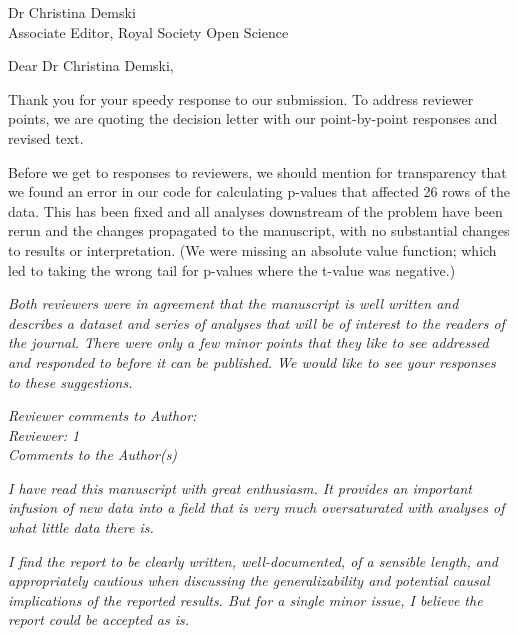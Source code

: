 \documentclass{stanfordletter}
\newcommand{\theysaid}[1]{\begin{leftbar} \noindent 
		\textsl{ #1}\end{leftbar}}
\begin{document}
	\signature{Veronica Boyce \\ Maya Mathur \\ Michael C. Frank}
	
	
	\begin{letter}{Dr Christina Demski \\ Associate Editor, Royal Society Open Science}
		
		
          \opening{Dear Dr Christina Demski,} 
          
          Thank you for your speedy response to our submission. 
          To address reviewer points, we are quoting the decision letter with our point-by-point responses and revised text. 
          
          Before we get to responses to reviewers, we should mention for transparency that we found an error in our code for calculating p-values that affected 26 rows of the data. This has been fixed and all analyses downstream of the problem have been rerun and the changes propagated to the manuscript, with no substantial changes to results or interpretation. (We were missing an absolute value function; which led to taking the wrong tail for p-values where the t-value was negative.)
          
          \theysaid{Both reviewers were in agreement that the manuscript is well written and describes a dataset and series of analyses that will be of interest to the readers of the journal. There were only a few minor points that they like to see addressed and responded to before it can be published. We would like to see your responses to these suggestions.}
          
          \theysaid{Reviewer comments to Author:\\
          Reviewer: 1 \\
          Comments to the Author(s)}
          
          \theysaid{I have read this manuscript with great enthusiasm. It provides an important infusion of new data into a field that is very much oversaturated with analyses of what little data there is.}
        
        \theysaid{I find the report to be clearly written, well-documented, of a sensible length, and appropriately cautious when discussing the generalizability and potential causal implications of the reported results. But for a single minor issue, I believe the report could be accepted as is.}
        

\end{letter}
\end{document}
